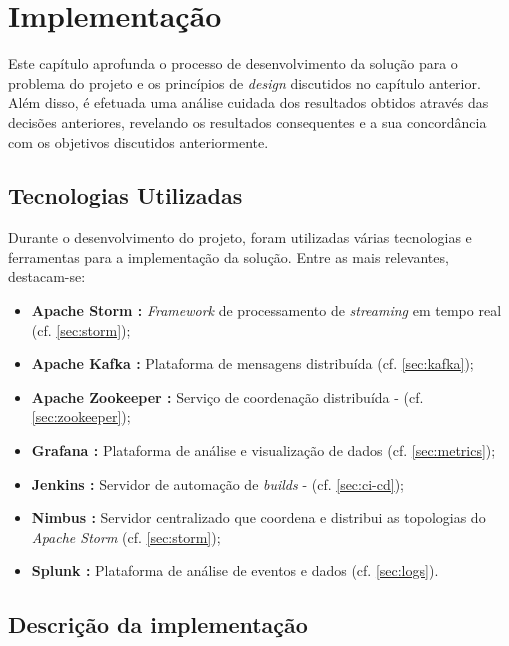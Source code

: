 \chapter{Implementação}
\label{sec:5-Implementacao}

Este capítulo aprofunda o processo de desenvolvimento da solução para o problema do projeto e os 
princípios de \textit{design} discutidos no capítulo anterior. Além disso, é efetuada uma análise 
cuidada dos resultados obtidos através das decisões anteriores, revelando os resultados
consequentes e a sua concordância com os objetivos discutidos anteriormente.

\section{Tecnologias Utilizadas}

Durante o desenvolvimento do projeto, foram utilizadas várias tecnologias e ferramentas para a 
implementação da solução. Entre as mais relevantes, destacam-se:

\begin{itemize}
  \item \textbf{Apache Storm \cite{storm}:} \textit{Framework} de processamento de 
    \textit{streaming} em tempo real (cf. \ref{sec:storm});
  \item \textbf{Apache Kafka \cite{kafka}:} Plataforma de mensagens distribuída (cf. \ref{sec:kafka});
  \item \textbf{Apache Zookeeper \cite{zookeeper}:} Serviço de coordenação distribuída - (cf.
    \ref{sec:zookeeper});
  \item \textbf{Grafana \cite{grafana}:} Plataforma de análise e visualização de dados (cf. 
    \ref{sec:metrics});
  \item \textbf{Jenkins \cite{jenkins}:} Servidor de automação de \textit{builds} - (cf.
    \ref{sec:ci-cd});
  \item \textbf{Nimbus \cite{nimbus}:} Servidor centralizado que coordena e distribui as topologias 
    do \textit{Apache Storm} (cf. \ref{sec:storm});
  \item \textbf{Splunk \cite{splunk}:} Plataforma de análise de eventos e dados (cf. \ref{sec:logs}).
\end{itemize}

\section{Descrição da implementação}

